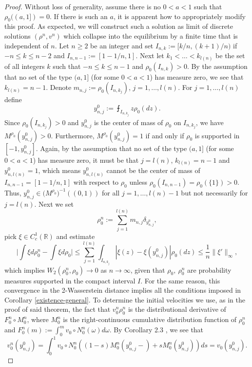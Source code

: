 \documentclass[11pt]{article}
\numberwithin{equation}{section}
\begin{document}
        \begin{proof} Without loss of generality, assume there is no $0<a<1$ such that $\rho_0((a,1])=0$. If there is such an $a$, it is apparent how to appropriately modify this proof. As expected, we will construct such a solution as limit of discrete solutions $(\rho^n,v^n)$ which collapse into the equilibrium by a finite time that is independent of $n$. Let $n\geq 2$ be an integer and set $I_{n,k}:=[k/n,(k+1)/n)$ if $-n\leq k\leq n-2$ and $I_{n,n-1}:=[1-1/n,1]$. Next let $k_1<\ldots<k_{l(n)}$ be the set of all integers $k$ such that $-n\leq k\leq n-1$ and $\rho_0(I_{n,k})>0$. By the assumption that no set of the type $(a,1]$ (for some $0<a<1$) has measure zero, we see that $k_{l(n)}=n-1$. Denote $m_{n,j}:=\rho_0(I_{n,k_j})$, $j=1,\ldots,l(n)$.
        For $j=1,\ldots,l(n)$ define 
        $$y^0_{n,j}:=\intbar_{I_{n,k_j}}z\rho_0(dz).$$
         Since $\rho_0(I_{n,k_j})>0$ and $y^0_{n,j}$ is the center of mass of $
        \rho_0$ on $I_{n,k_j}$, we have $M^{\rho_0}(y^0_{n,j})>0$. Furthermore, $M^{\rho_0}(y^0_{n,j})=1$  if and only if $\rho_0$ is supported in $[-1,y^0_{n,j}]$.  Again, by the assumption that no set of the type $(a,1]$ (for some $0<a<1$) has measure zero, it must be that $j=l(n)$, $k_{l(n)}=n-1$ and $y^0_{n,l(n)}=1$, which means $y^0_{n,l(n)}$ cannot be the center of mass of $I_{n,n-1}=[1-1/n,1]$ with respect to $\rho_0$ unless $\rho_0(I_{n,n-1})=\rho_0(\{1\})>0$. Thus,  $y^0_{n,j}\in \big(M^{\rho_0}\big)^{-1}((0,1))$ for all $j=1,\ldots,l(n)-1$ but not necessarily for $j=l(n)$.
        Next we set $$\rho^n_0:=\sum_{j=1}^{l(n)}m_{n,j}\delta_{y^0_{n,j}},$$ pick $\xi\in C^1_c(\mathbb{R})$ and estimate
        $$\bigg|\int\xi d\rho_0^n-\int\xi d\rho_0\bigg|\leq\sum_{j=1}^{l(n)}\int_{I_{n,k_j}}|\xi(z)-\xi(y^0_{n,j})|\rho_0(dz)\leq\frac{1}{n}\|\xi'\|_\infty,$$
        which implies $W_2(\rho_0^n,\rho_0)\rightarrow 0$ as $n\rightarrow\infty$, given that $\rho_0,\ \rho_0^n$ are probability measures supported in the compact interval $I$. For the same reason, this convergence in the 2-Wasserstein distance implies all the conditions imposed in Corollary \ref{existence-general}. To determine the initial velocities we use, as in the proof of said theorem, the fact that $v_0^n\rho_0^n$ is the distributional derivative of $F^n_0\circ M_0^n$, where $M_0^n$ is the right-continuous cumulative distribution function of $\rho_0^n$ and $F^n_0(m):=\int_0^m v_0\circ N_0^n(\omega)d\omega$. By Corollary 2.3 \cite{Tudorascu-2008}, we see that 
        $$v_0^n(y^0_{n,j})=\int_0^1v_0\circ N_0^n((1-s)M_0^n(y^0_{n,j}-)+sM_0^n(y_{n,j}^0))ds=v_0(y_{n,j}^0).$$

\end{proof}
\end{document}
